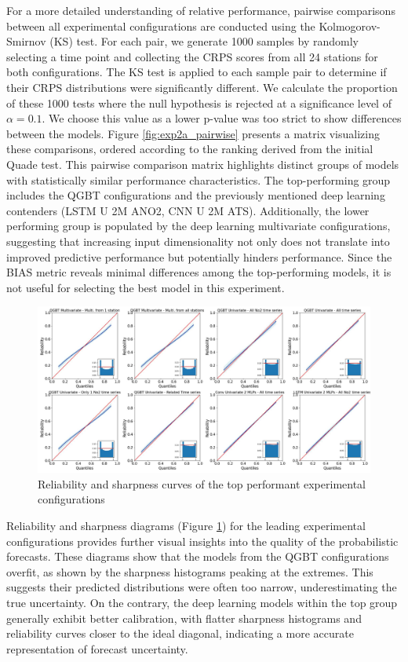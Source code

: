\documentclass[12pt,a4paper]{book}
\begin{document}
For a more detailed understanding of relative performance, pairwise comparisons between all experimental configurations are conducted using the Kolmogorov-Smirnov (KS) test. For each pair, we generate 1000 samples by randomly selecting a time point and collecting the CRPS scores from all 24 stations for both configurations. The KS test is applied to each sample pair to determine if their CRPS distributions were significantly different. We calculate the proportion of these 1000 tests where the null hypothesis is rejected at a significance level of $\alpha = 0.1$. We choose this value as a lower p-value was too strict to show differences between the models. Figure \ref{fig:exp2a_pairwise} presents a matrix visualizing these comparisons, ordered according to the ranking derived from the initial Quade test. This pairwise comparison matrix highlights distinct groups of models with statistically similar performance characteristics. The top-performing group includes the QGBT configurations and the previously mentioned deep learning contenders (LSTM U 2M ANO2, CNN U 2M ATS). Additionally, the lower performing group is populated by the deep learning multivariate configurations, suggesting that increasing input dimensionality not only does not translate into improved predictive performance but potentially hinders performance. Since the BIAS metric reveals minimal differences among the top‐performing models, it is not useful for selecting the best model in this experiment.

\begin{figure}[h] 
  \centering  
  \includegraphics[width=1\textwidth]{exp2a_rel_sharp.jpg}
  \caption{Reliability and sharpness curves of the top performant experimental configurations}
  \label{fig:exp2a_rel_sharp}
\end{figure}

Reliability and sharpness diagrams (Figure \ref{fig:exp2a_rel_sharp}) for the leading experimental configurations provides further visual insights into the quality of the probabilistic forecasts. These diagrams show that the models from the QGBT configurations overfit, as shown by the sharpness histograms peaking at the extremes. This suggests their predicted distributions were often too narrow, underestimating the true uncertainty. On the contrary, the deep learning models within the top group generally exhibit better calibration, with flatter sharpness histograms and reliability curves closer to the ideal diagonal, indicating a more accurate representation of forecast uncertainty.
\end{document}
